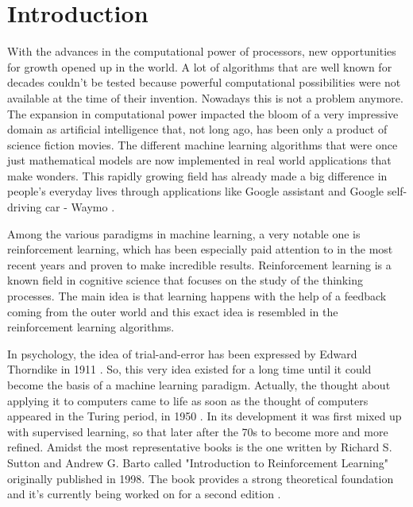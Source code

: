 \chapter{Introduction}\label{Introduction}
With the advances in the computational power of processors, new opportunities for growth opened up in the world. A lot of algorithms that are well known for decades couldn't be tested because powerful computational possibilities were not available at the time of their invention. Nowadays this is not a problem anymore. The expansion in computational power impacted the bloom of a very impressive domain as artificial intelligence that, not long ago, has been only a product of science fiction movies. The different machine learning algorithms that were once just mathematical models are now implemented in real world applications that make wonders. This rapidly growing field has already made a big difference in people's everyday lives through applications like Google assistant and Google self-driving car - Waymo \cite{waymo}.

Among the various paradigms in machine learning, a very notable one is reinforcement learning, which has been especially paid attention to in the most recent years and proven to make incredible results. Reinforcement learning is a known field in cognitive science that focuses on the study of the thinking processes. The main idea is that learning happens with the help of a feedback coming from the outer world and this exact idea is resembled in the reinforcement learning algorithms. 

In psychology, the idea of trial-and-error has been expressed by Edward Thorndike in 1911 \cite{Sutton:1998:IRL:551283}. So, this very idea existed for a long time until it could become the basis of a machine learning paradigm. Actually, the thought about applying it to computers came to life as soon as the thought of computers appeared in the Turing period, in 1950 \cite{Sutton:1998:IRL:551283}. In its development it was first mixed up with supervised learning, so that later after the 70s to become more and more refined. Amidst the most representative books is the one written by Richard S. Sutton and Andrew G. Barto called "Introduction to Reinforcement Learning" \cite{Sutton:1998:IRL:551283} originally published in 1998. The book \cite{Sutton:1998:IRL:551283} provides a strong theoretical foundation and it's currently being worked on for a second edition \cite{Sutton}.


